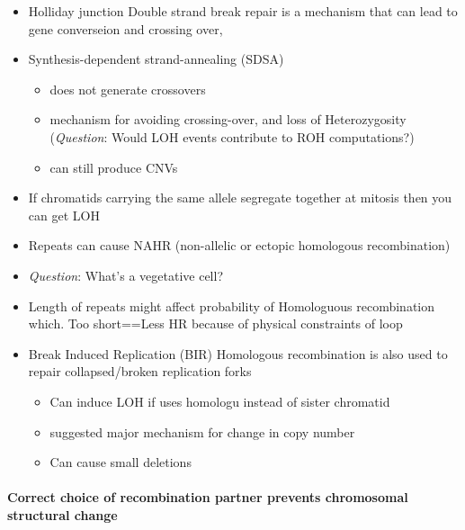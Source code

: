 \documentclass[]{book}
\providecommand{\tightlist}{%
  \setlength{\itemsep}{0pt}\setlength{\parskip}{0pt}}
\let\oldparagraph\paragraph
\renewcommand{\paragraph}[1]{\oldparagraph{#1}\mbox{}}
\begin{document}
\begin{itemize}
\tightlist
\item
  Holliday junction Double strand break repair is a mechanism that can lead to gene converseion and crossing over,
\item
  Synthesis-dependent strand-annealing (SDSA)

  \begin{itemize}
  \tightlist
  \item
    does not generate crossovers
  \item
    mechanism for avoiding crossing-over, and loss of Heterozygosity (\emph{Question}: Would LOH events contribute to ROH computations?)
  \item
    can still produce CNVs
  \end{itemize}
\item
  If chromatids carrying the same allele segregate together at mitosis then you can get LOH
\item
  Repeats can cause NAHR (non-allelic or ectopic homologous recombination)
\item
  \emph{Question}: What's a vegetative cell?
\item
  Length of repeats might affect probability of Homologuous recombination which. Too short==Less HR because of physical constraints of loop
\item
  Break Induced Replication (BIR) Homologous recombination is also used to repair collapsed/broken replication forks

  \begin{itemize}
  \tightlist
  \item
    Can induce LOH if uses homologu instead of sister chromatid
  \item
    suggested major mechanism for change in copy number
  \item
    Can cause small deletions
  \end{itemize}
\end{itemize}

\hypertarget{correct-choice-of-recombination-partner-prevents-chromosomal-structural-change}{%
\paragraph{Correct choice of recombination partner prevents chromosomal structural change}\label{correct-choice-of-recombination-partner-prevents-chromosomal-structural-change}}
\end{document}
